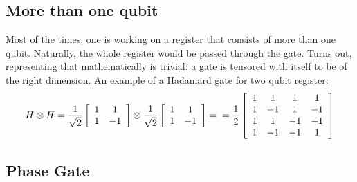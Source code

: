 \documentclass[12pt]{report}
\begin{document}
\subsection{More than one qubit}
Most of the times, one is working on a register that consists of more than one qubit. Naturally, the whole register would be passed through the gate. Turns out, representing that mathematically is trivial: a gate is tensored with itself to be of the right dimension. An example of a Hadamard gate for two qubit register:
\begin{equation}
H \otimes H = \frac{1}{\sqrt{2}} 
\left[
{
\begin{array} {cc}
1 & 1 \\
1 & -1 \\
\end{array} 
}
\right] \otimes \frac{1}{\sqrt{2}} 
\left[
{
\begin{array} {cc}
1 & 1 \\
1 & -1 \\
\end{array} 
}
\right] = \\ = \frac{1}{2}
\left[
{
\begin{array} {cccc}
1 & 1 & 1 & 1\\
1 & -1 & 1 & -1 \\
1 & 1 & -1 & -1  \\
1 & -1 & -1 & 1 \\
\end{array} 
}
\right]
\end{equation}
\subsection{Phase Gate}
\end{document}

